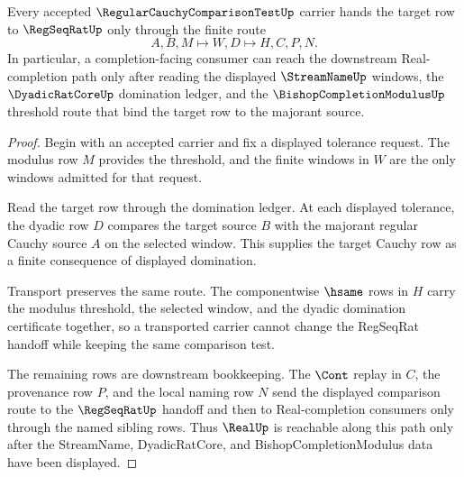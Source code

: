 \begin{theorem}
\label{thm:regular-cauchy-comparison-test-regseqrat-handoff}
Every accepted $\RegularCauchyComparisonTestUp$ carrier hands the target row to $\RegSeqRatUp$ only through the finite route
$$
A,B,M\longmapsto W,D\longmapsto H,C,P,N.
$$
In particular, a completion-facing consumer can reach the downstream Real-completion path only after reading the displayed $\StreamNameUp$ windows, the $\DyadicRatCoreUp$ domination ledger, and the $\BishopCompletionModulusUp$ threshold route that bind the target row to the majorant source.
\end{theorem}
\begin{proof}
Begin with an accepted carrier and fix a displayed tolerance request. The modulus row $M$ provides the threshold, and the finite windows in $W$ are the only windows admitted for that request.

Read the target row through the domination ledger. At each displayed tolerance, the dyadic row $D$ compares the target source $B$ with the majorant regular Cauchy source $A$ on the selected window. This supplies the target Cauchy row as a finite consequence of displayed domination.

Transport preserves the same route. The componentwise $\hsame$ rows in $H$ carry the modulus threshold, the selected window, and the dyadic domination certificate together, so a transported carrier cannot change the RegSeqRat handoff while keeping the same comparison test.

The remaining rows are downstream bookkeeping. The $\Cont$ replay in $C$, the provenance row $P$, and the local naming row $N$ send the displayed comparison route to the $\RegSeqRatUp$ handoff and then to Real-completion consumers only through the named sibling rows. Thus $\RealUp$ is reachable along this path only after the StreamName, DyadicRatCore, and BishopCompletionModulus data have been displayed.
\end{proof}



